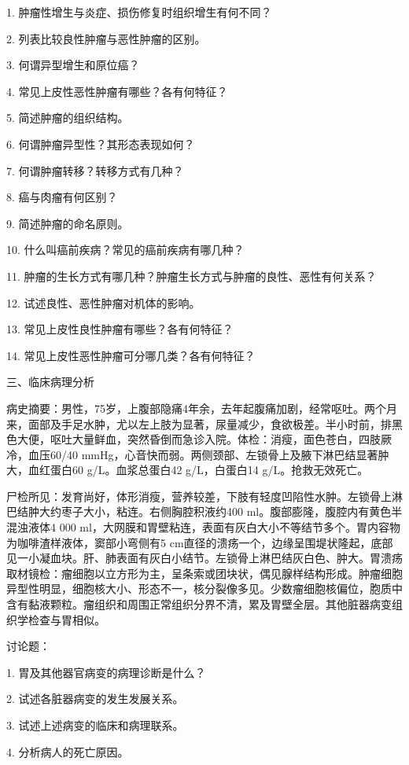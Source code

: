 1. 肿瘤性增生与炎症、损伤修复时组织增生有何不同？

2. 列表比较良性肿瘤与恶性肿瘤的区别。

3. 何谓异型增生和原位癌？

4. 常见上皮性恶性肿瘤有哪些？各有何特征？

5. 简述肿瘤的组织结构。

6. 何谓肿瘤异型性？其形态表现如何？

7. 何谓肿瘤转移？转移方式有几种？

8. 癌与肉瘤有何区别？

9. 简述肿瘤的命名原则。

10. 什么叫癌前疾病？常见的癌前疾病有哪几种？

11. 肿瘤的生长方式有哪几种？肿瘤生长方式与肿瘤的良性、恶性有何关系？

12. 试述良性、恶性肿瘤对机体的影响。

13. 常见上皮性良性肿瘤有哪些？各有何特征？

14. 常见上皮性恶性肿瘤可分哪几类？各有何特征？

{三、临床病理分析}

病史摘要：男性，75岁，上腹部隐痛4年余，去年起腹痛加剧，经常呕吐。两个月来，面部及手足水肿，尤以左上肢为显著，尿量减少，食欲极差。半小时前，排黑色大便，呕吐大量鲜血，突然昏倒而急诊入院。体检：消瘦，面色苍白，四肢厥冷，血压60/40
mmHg，心音快而弱。两侧颈部、左锁骨上及腋下淋巴结显著肿大，血红蛋白60
g/L。血浆总蛋白42 g/L，白蛋白14 g/L。抢救无效死亡。

尸检所见：发育尚好，体形消瘦，营养较差，下肢有轻度凹陷性水肿。左锁骨上淋巴结肿大约枣子大小，粘连。右侧胸腔积液约400
ml。腹部膨隆，腹腔内有黄色半混浊液体4 000
ml，大网膜和胃壁粘连，表面有灰白大小不等结节多个。胃内容物为咖啡渣样液体，窦部小弯侧有5
cm直径的溃疡一个，边缘呈围堤状隆起，底部见一小凝血块。肝、肺表面有灰白小结节。左锁骨上淋巴结灰白色、肿大。胃溃疡取材镜检：瘤细胞以立方形为主，呈条索或团块状，偶见腺样结构形成。肿瘤细胞异型性明显，细胞核大小、形态不一，核分裂像多见。少数瘤细胞核偏位，胞质中含有黏液颗粒。瘤组织和周围正常组织分界不清，累及胃壁全层。其他脏器病变组织学检查与胃相似。

讨论题：

1. 胃及其他器官病变的病理诊断是什么？

2. 试述各脏器病变的发生发展关系。

3. 试述上述病变的临床和病理联系。

4. 分析病人的死亡原因。




